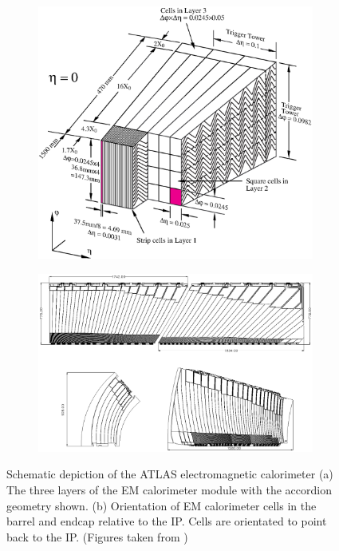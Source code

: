 \begin{figure}[h!]
\begin{center}
    \begin{subfigure}[a]{0.40\textwidth}   
        \includegraphics[width=\textwidth, angle=0]{figures/LHC_ATLAS/LARG3-TDR-barrelM.eps}
    \end{subfigure}
    \begin{subfigure}[b]{0.50\textwidth}
	\includegraphics[width=\textwidth, angle=0]{figures/LHC_ATLAS/LARG3-abcdM.eps}
    \end{subfigure}
\caption[Schematic depiction of the ATLAS electromagnetic calorimeter module and cells]{ Schematic depiction of the ATLAS electromagnetic calorimeter (a) The three layers of the EM calorimeter module with the accordion geometry shown. (b) Orientation of EM calorimeter cells in the barrel and endcap relative to the IP.  Cells are orientated to point back to the IP.  (Figures taken from \cite{ATLAS_JINST}) \label{LHC:fig:EMCalo}}
\end{center}
\end{figure}

